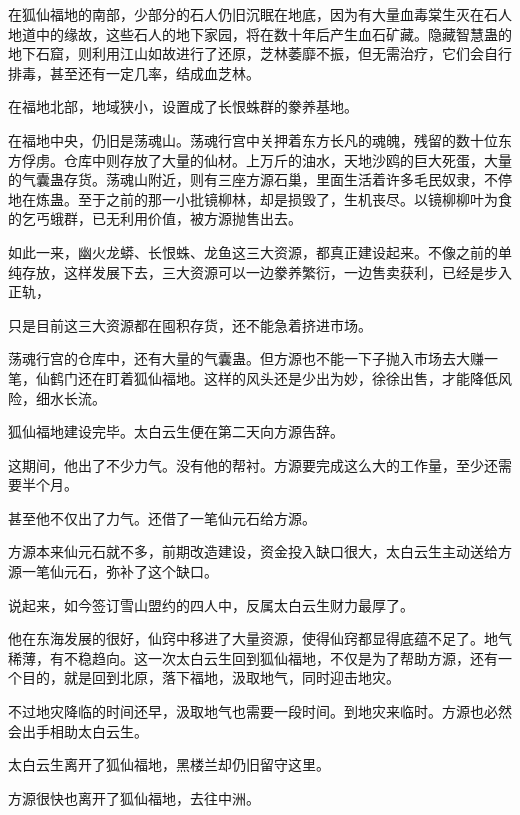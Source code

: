 
\begin{this_body}



在狐仙福地的南部，少部分的石人仍旧沉眠在地底，因为有大量血毒棠生灭在石人地道中的缘故，这些石人的地下家园，将在数十年后产生血石矿藏。隐藏智慧蛊的地下石窟，则利用江山如故进行了还原，芝林萎靡不振，但无需治疗，它们会自行排毒，甚至还有一定几率，结成血芝林。

在福地北部，地域狭小，设置成了长恨蛛群的豢养基地。

在福地中央，仍旧是荡魂山。荡魂行宫中关押着东方长凡的魂魄，残留的数十位东方俘虏。仓库中则存放了大量的仙材。上万斤的油水，天地沙鸥的巨大死蛋，大量的气囊蛊存货。荡魂山附近，则有三座方源石巢，里面生活着许多毛民奴隶，不停地在炼蛊。至于之前的那一小批镜柳林，却是损毁了，生机丧尽。以镜柳柳叶为食的乞丐蛾群，已无利用价值，被方源抛售出去。

如此一来，幽火龙蟒、长恨蛛、龙鱼这三大资源，都真正建设起来。不像之前的单纯存放，这样发展下去，三大资源可以一边豢养繁衍，一边售卖获利，已经是步入正轨，

只是目前这三大资源都在囤积存货，还不能急着挤进市场。

荡魂行宫的仓库中，还有大量的气囊蛊。但方源也不能一下子抛入市场去大赚一笔，仙鹤门还在盯着狐仙福地。这样的风头还是少出为妙，徐徐出售，才能降低风险，细水长流。

狐仙福地建设完毕。太白云生便在第二天向方源告辞。

这期间，他出了不少力气。没有他的帮衬。方源要完成这么大的工作量，至少还需要半个月。

甚至他不仅出了力气。还借了一笔仙元石给方源。

方源本来仙元石就不多，前期改造建设，资金投入缺口很大，太白云生主动送给方源一笔仙元石，弥补了这个缺口。

说起来，如今签订雪山盟约的四人中，反属太白云生财力最厚了。

他在东海发展的很好，仙窍中移进了大量资源，使得仙窍都显得底蕴不足了。地气稀薄，有不稳趋向。这一次太白云生回到狐仙福地，不仅是为了帮助方源，还有一个目的，就是回到北原，落下福地，汲取地气，同时迎击地灾。

不过地灾降临的时间还早，汲取地气也需要一段时间。到地灾来临时。方源也必然会出手相助太白云生。

太白云生离开了狐仙福地，黑楼兰却仍旧留守这里。

方源很快也离开了狐仙福地，去往中洲。


\end{this_body}
